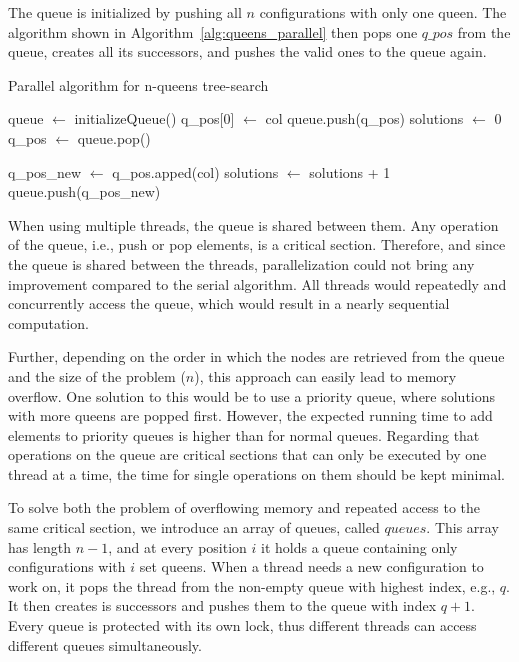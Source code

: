 The queue is initialized by pushing all $n$ configurations with only one queen.
The algorithm shown in Algorithm~\ref{alg:queens_parallel} then pops one $q\_pos$ from the queue, creates all its successors, and pushes the valid ones to the queue again.

\begin{algorithm}[H]
\caption{Parallel algorithm for n-queens tree-search}
\label{alg:queens_parallel}
\begin{algorithmic}[1]
    \State queue $\gets$ initializeQueue()
        \State q\_pos[0] $\gets$ col
        \State queue.push(q\_pos)
    \EndFor
    \State
    \State solutions $\gets$ 0
        \State q\_pos $\gets$ queue.pop()
        
            \State q\_pos\_new $\gets$ q\_pos.apped(col)
                    \State solutions $\gets$ solutions + 1
                \Else
                    \State queue.push(q\_pos\_new)
                \EndIf
            \EndIf
        \EndFor
    \EndWhile
    \State{}
    \EndFunction
\end{algorithmic}
\end{algorithm}

When using multiple threads, the queue is shared between them.
Any operation of the queue, i.e., push or pop elements, is a critical section.
Therefore, and since the queue is shared between the threads, parallelization could not bring any improvement compared to the serial algorithm.
All threads would repeatedly and concurrently access the queue, which would result in a nearly sequential computation.

Further, depending on the order in which the nodes are retrieved from the queue and the size of the problem ($n$), this approach can easily lead to memory overflow.
One solution to this would be to use a priority queue, where solutions with more queens are popped first.
However, the expected running time to add elements to priority queues is higher than for normal queues.
Regarding that operations on the queue are critical sections that can only be executed by one thread at a time, the time for single operations on them should be kept minimal.

To solve both the problem of overflowing memory and repeated access to the same critical section, we introduce an array of queues, called $queues$.
This array has length $n-1$, and at every position $i$ it holds a queue containing only configurations with $i$ set queens.
When a thread needs a new configuration to work on, it pops the thread from the non-empty queue with highest index, e.g., $q$.
It then creates is successors and pushes them to the queue with index $q+1$.
Every queue is protected with its own lock, thus different threads can access different queues simultaneously.

